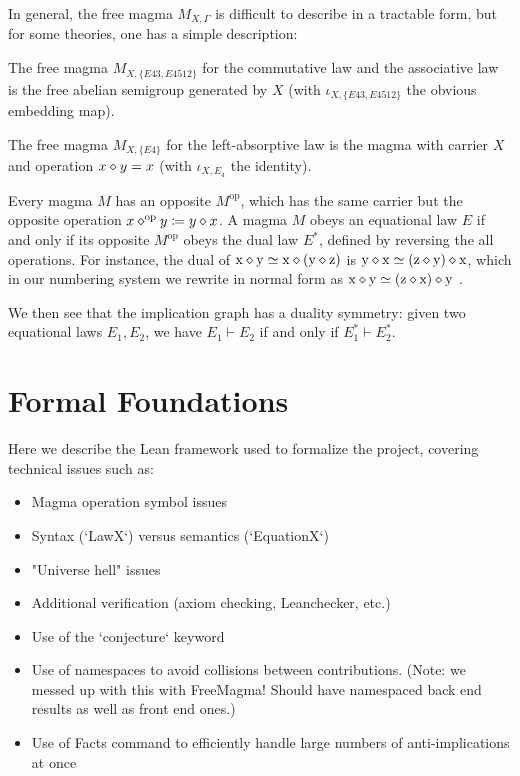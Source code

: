 In general, the free magma $M_{X,\Gamma}$ is difficult to describe in a tractable form, but for some theories, one has a simple description:

\begin{example}\label{semi-group} The free magma $M_{X,\{E43, E4512\}}$ for the commutative law  and the associative law  is the free abelian semigroup generated by $X$ (with $\iota_{X,\{E43,E4512\}}$ the obvious embedding map).
\end{example}

\begin{example}\label{left-absorb}
The free magma $M_{X,\{E4\}}$ for the left-absorptive law  is the magma with carrier $X$ and operation $x \diamond y = x$ (with $\iota_{X,E_4}$ the identity).
\end{example}


Every magma $M$ has an opposite $M^{\mathrm{op}}$, which has the same carrier but the opposite operation $x \diamond^{\mathrm{op}} y \coloneqq y \diamond x$.  A magma $M$ obeys an equational law $E$ if and only if its opposite $M^{\mathrm{op}}$ obeys the dual law $E^*$, defined by reversing the all operations.  For instance, the dual of
$\mathrm{x} \diamond \mathrm{y} \simeq \mathrm{x} \diamond (\mathrm{y} \diamond \mathrm{z})$  is $\mathrm{y} \diamond \mathrm{x} \simeq (\mathrm{z} \diamond \mathrm{y}) \diamond \mathrm{x}$, which in our numbering system we rewrite in normal form as $\mathrm{x} \diamond \mathrm{y} \simeq (\mathrm{z} \diamond \mathrm{x}) \diamond \mathrm{y}$ .

We then see that the implication graph has a duality symmetry: given two equational laws $E_1,E_2$, we have $E_1 \vdash E_2$ if and only if $E_1^* \vdash E_2^*$.

\section{Formal Foundations}


Here we describe the Lean framework used to formalize the project, covering technical issues such as:

\begin{itemize}
    \item Magma operation symbol issues
    \item Syntax (`LawX`) versus semantics (`EquationX`)
    \item "Universe hell" issues
    \item Additional verification (axiom checking, Leanchecker, etc.)
    \item Use of the `conjecture` keyword
    \item Use of namespaces to avoid collisions between contributions. (Note: we messed up with this with FreeMagma! Should have namespaced back end results as well as front end ones.)
    \item Use of Facts command to efficiently handle large numbers of anti-implications at once
\end{itemize}

